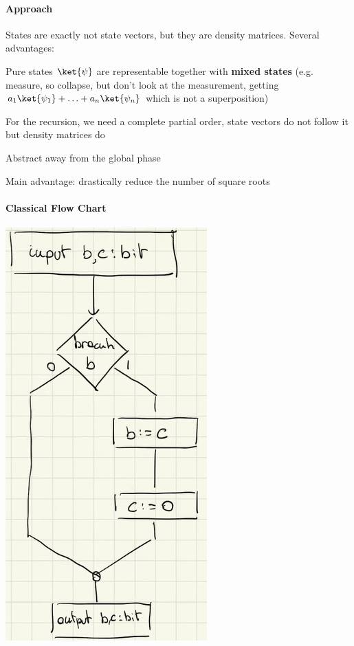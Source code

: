 \documentclass[10pt]{report}
\begin{document}
\paragraph{Approach} States are exactly not state vectors, but they are density matrices. Several advantages: \begin{list}{}{}
	\item Pure states $\ket{\psi}$ are representable together with \textbf{mixed states} (e.g. measure, so collapse, but don't look at the measurement, getting $a_1\ket{\psi_1}+\ldots+a_n\ket{\psi_n}$ which is not a superposition)
	\item For the recursion, we need a complete partial order, state vectors do not follow it but density matrices do
	\item Abstract away from the global phase
	\item Main advantage: drastically reduce the number of square roots
\end{list} 
\paragraph{Classical Flow Chart}
\begin{center}
	\includegraphics[scale=0.5]{42.png}
\end{center}
\end{document}
